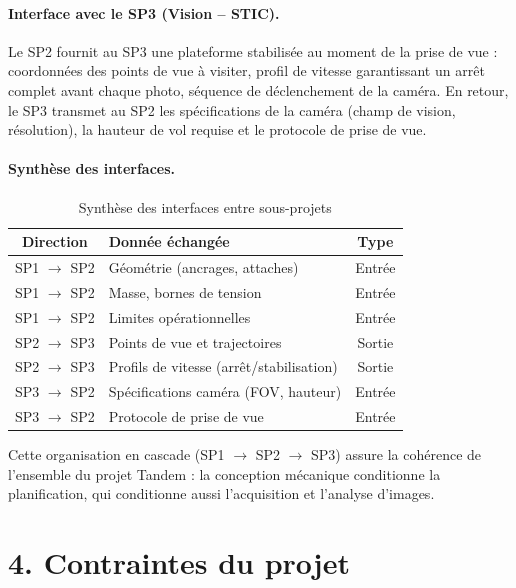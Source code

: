 \paragraph{Interface avec le SP3 (Vision -- STIC).}
Le SP2 fournit au SP3 une plateforme stabilisée au moment de la prise de vue : coordonnées des points de vue à visiter, profil de vitesse garantissant un arrêt complet avant chaque photo, séquence de déclenchement de la caméra. En retour, le SP3 transmet au SP2 les spécifications de la caméra (champ de vision, résolution), la hauteur de vol requise et le protocole de prise de vue.

\paragraph{Synthèse des interfaces.}

\begin{table}[H]
\centering
\caption{Synthèse des interfaces entre sous-projets}
\label{tab:interfaces}
\begin{tabular}{|c|>{\raggedright\arraybackslash}p{6.2cm}|c|}
\hline
\textbf{Direction} & \textbf{Donnée échangée} & \textbf{Type} \\
\hline
SP1 $\rightarrow$ SP2 & Géométrie (ancrages, attaches) & Entrée \\
\hline
SP1 $\rightarrow$ SP2 & Masse, bornes de tension & Entrée \\
\hline
SP1 $\rightarrow$ SP2 & Limites opérationnelles & Entrée \\
\hline
SP2 $\rightarrow$ SP3 & Points de vue et trajectoires & Sortie \\
\hline
SP2 $\rightarrow$ SP3 & Profils de vitesse (arrêt/stabilisation) & Sortie \\
\hline
SP3 $\rightarrow$ SP2 & Spécifications caméra (FOV, hauteur) & Entrée \\
\hline
SP3 $\rightarrow$ SP2 & Protocole de prise de vue & Entrée \\
\hline
\end{tabular}
\end{table}

Cette organisation en cascade (SP1 $\rightarrow$ SP2 $\rightarrow$ SP3) assure la cohérence de l'ensemble du projet Tandem : la conception mécanique conditionne la planification, qui conditionne aussi l'acquisition et l'analyse d'images.

\section*{4. Contraintes du projet}

